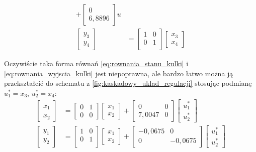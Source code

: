 \begin{align}
+
\begin{bmatrix}
    0 \\ 6,8896
\end{bmatrix}
u \label{eq:rownania_stanu_belki} \\%
\begin{bmatrix}
    y_3 \\ y_4
\end{bmatrix}
&= \begin{bmatrix}
    1 & 0 \\
    0 & 1 \\
\end{bmatrix}
\begin{bmatrix}
    x_3 \\ x_4
\end{bmatrix} \label{eq:rownania_wyjscia_belki} 
\end{align}

Oczywiście taka forma równań \eqref{eq:rownania_stanu_kulki} i \eqref{eq:rownania_wyjscia_kulki} jest niepoprawna, ale bardzo łatwo można ją przekształcić do schematu z \cref{fig:kaskadowy_uklad_regulacji} stosując podmianę $u_1^* = x_3$, $u_2^* = x_4$: %
\begin{align}
\begin{bmatrix}
    \dot{x}_1 \\ \dot{x}_2
\end{bmatrix}
&= \begin{bmatrix}
    0 & 1 \\
    0 & 0
\end{bmatrix}
\begin{bmatrix}
x_1 \\ x_2
\end{bmatrix}
+
\begin{bmatrix}
    0 & 0 \\ 7,0047 & 0
\end{bmatrix}
\begin{bmatrix}
    u_1^* \\ u_2^*
\end{bmatrix} \label{eq:rownania_stanu_kulki2} \\
\begin{bmatrix}
    y_1 \\ y_2
\end{bmatrix}
&= \begin{bmatrix}
    1 & 0 \\
    0 & 1 \\
\end{bmatrix}
\begin{bmatrix}
    x_1 \\ x_2
\end{bmatrix}
+ \begin{bmatrix}
    -0,0675 & 0 \\
    0 & -0,0675
\end{bmatrix}
\begin{bmatrix}
    u_1^* \\ u_2^*
\end{bmatrix} \label{eq:rownania_wyjscia_kulki2}
\end{align}

